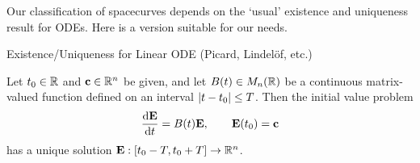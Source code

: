 Our classification of spacecurves depends on the `usual' existence and uniqueness result for ODEs. Here is a version suitable for our needs.
% 
% 
% 
% 
% 

\begin{thm}{Existence/Uniqueness for Linear ODE (Picard, Lindelöf, etc.)}{}\phantom{bob}\par
	Let $t_0\in\R$ and $\vc\in\R^n$ be given, and let $B(t)\in M_n(\R)$ be a continuous matrix-valued function defined on an interval $\nm{t-t_0}\le T$. Then the initial value problem
	\[
		\diff[\vE]{t}=B(t)\vE,\qquad \vE(t_0)=\vc
	\]
	has a unique solution $\vE:[t_0-T,t_0+T]\to \R^n$.
\end{thm}


